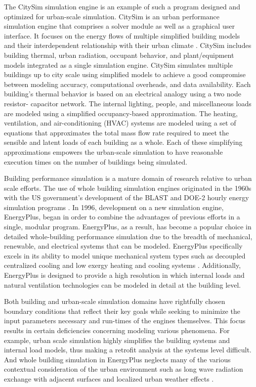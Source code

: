 \documentclass{tBPS2e}
\theoremstyle{plain}
\theoremstyle{definition}
\theoremstyle{remark}
\newcommand{\noteDT}[1]{\footnote{\textcolor{green}{#1}}}
\begin{document}
The CitySim simulation engine is an example of such a program designed and
optimized for urban-scale simulation. CitySim is an urban performance
simulation engine that comprises a solver module as well as a graphical user
interface. It focuses on the energy flows of multiple simplified building
models and their interdependent relationship with their urban climate
\citep{Robinson:2009tm}. CitySim includes building thermal, urban radiation,
occupant behavior, and plant/equipment models integrated as a single
simulation engine. CitySim simulates multiple buildings up to city scale using
simplified models to achieve a good compromise between modeling
accuracy, computational overheads, and data availability. Each building's
thermal behavior is based on an electrical analogy using a two node resistor-
capacitor network. The internal lighting, people, and miscellaneous loads are
modeled using a simplified occupancy-based approximation. The heating,
ventilation, and air-conditioning (HVAC) systems are modeled using a
set of equations that approximates the total mass flow rate required to meet the
sensible and latent loads of each building as a whole. Each of these
simplifying approximations empowers the urban-scale simulation to have
reasonable execution times on the number of buildings being
simulated.

Building performance simulation is a mature domain of research relative to
urban scale efforts. The use of whole building simulation engines originated
in the 1960s with the US government's development of the BLAST and DOE-2
hourly energy simulation programs \citep{Lawrie:2001vf}. In 1996, development
on a new simulation engine, EnergyPlus, began in order to combine the
advantages of previous efforts in a single, modular program. EnergyPlus, as a
result, has become a popular choice in detailed whole-building performance
simulation due to the breadth of mechanical, renewable, and electrical systems
that can be modeled. EnergyPlus specifically excels in its ability to model
unique mechanical system types such as decoupled centralized cooling
\citep{Miller:2010wa} and low exergy heating and cooling systems
\citep{barbara:2015tz}. Additionally, EnergyPlus is designed to provide a high
resolution in which internal loads and natural ventilation technologies can be
modeled in detail at the building level.

Both building and urban-scale simulation domains have rightfully chosen
boundary conditions that reflect their key goals while seeking to minimize the
input parameters necessary and run-times of the engines themselves. This focus
results in certain deficiencies concerning modeling various phenomena.
For example, urban scale simulation highly simplifies the building systems and
internal load models, thus making a retrofit analysis at the systems level
difficult. And whole building simulation in EnergyPlus neglects many of the
various contextual consideration of the urban environment such as long wave
radiation exchange with adjacent surfaces and localized urban weather effects
\citep{Lawrie:2001vf}.%
\end{document}
